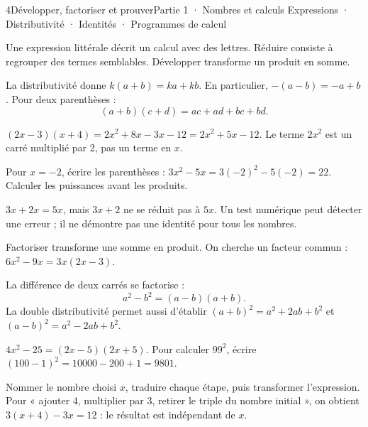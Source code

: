 \begin{ouverture}[courbe]{4}{Développer, factoriser et prouver}{Partie 1 · Nombres et calculs}
{Expressions · Distributivité · Identités · Programmes de calcul}
\end{ouverture}
\pagestyle{otMain}\essentiel\fontsize{11}{15}\selectfont
{}
\begin{definition}Une expression littérale décrit un calcul avec des lettres. Réduire consiste à regrouper des termes semblables. Développer transforme un produit en somme.\end{definition}
\begin{propriete}La distributivité donne $k(a+b)=ka+kb$. En particulier, $-(a-b)=-a+b$. Pour deux parenthèses :
\[(a+b)(c+d)=ac+ad+bc+bd.\]\end{propriete}
\begin{exemple}$(2x-3)(x+4)=2x^2+8x-3x-12=2x^2+5x-12$. Le terme $2x^2$ est un carré multiplié par 2, pas un terme en $x$.\end{exemple}
\begin{savoirfaire}Pour $x=-2$, écrire les parenthèses : $3x^2-5x=3(-2)^2-5(-2)=22$. Calculer les puissances avant les produits.\end{savoirfaire}
\begin{attention}$3x+2x=5x$, mais $3x+2$ ne se réduit pas à $5x$. Un test numérique peut détecter une erreur ; il ne démontre pas une identité pour tous les nombres.\end{attention}
\clearpage
{}
\begin{definition}Factoriser transforme une somme en produit. On cherche un facteur commun : $6x^2-9x=3x(2x-3)$.\end{definition}
\begin{propriete}La différence de deux carrés se factorise :
\[a^2-b^2=(a-b)(a+b).\]
La double distributivité permet aussi d’établir
$(a+b)^2=a^2+2ab+b^2$ et $(a-b)^2=a^2-2ab+b^2$.\end{propriete}
\begin{exemple}$4x^2-25=(2x-5)(2x+5)$. Pour calculer $99^2$, écrire $(100-1)^2=10000-200+1=9801$.\end{exemple}
\begin{savoirfaire}Nommer le nombre choisi $x$, traduire chaque étape, puis transformer l’expression. Pour « ajouter 4, multiplier par 3, retirer le triple du nombre initial », on obtient $3(x+4)-3x=12$ : le résultat est indépendant de $x$.\end{savoirfaire}
